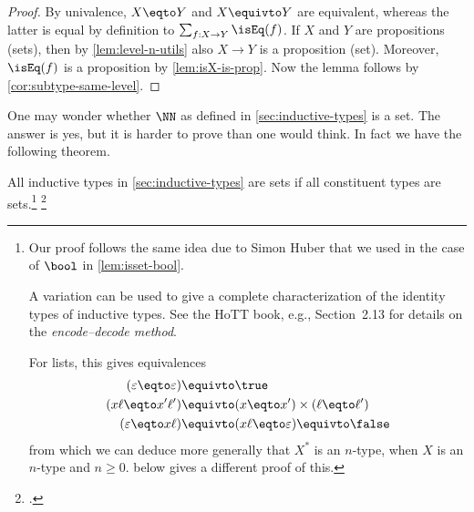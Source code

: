 \begin{proof}
 By univalence, $X \eqto Y$ and $X\equivto Y$ are equivalent,
 whereas the latter is equal by definition to $\sum_{f:X\to Y} \isEq(f)$.
 If $X$ and $Y$ are propositions (sets),
 then by \cref{lem:level-n-utils} also $X\to Y$ is a proposition (set).
 Moreover, $\isEq(f)$ is a proposition by \cref{lem:isX-is-prop}.
 Now the lemma follows by \cref{cor:subtype-same-level}.
\end{proof}

One may wonder whether $\NN$ as defined in \cref{sec:inductive-types}
is a set. The answer is yes, but it is harder to prove than one
would think. In fact we have the following theorem.

\begin{theorem}\label{thm:isset-inductive-types}
  All inductive types in \cref{sec:inductive-types} are sets
  if all constituent types are sets.\footnote{%
    Our proof follows the same
    idea due to Simon Huber that we used in the
    case of $\bool$ in \cref{lem:isset-bool}.

    A variation can be used to give a complete
    characterization of the identity types of
    inductive types.
    See the HoTT book, e.g., Section~2.13 for details
    on the \emph{encode--decode method}.\footnotemark{}

    For lists, this gives equivalences
    \begin{align*}
      (\varepsilon \eqto \varepsilon) &\equivto \true \\
      (x\ell \eqto x'\ell') &\equivto (x \eqto x')\times(\ell \eqto \ell') \\
      (\varepsilon \eqto x\ell) &\equivto (x\ell \eqto \varepsilon) \equivto \false
    \end{align*}
    from which we can deduce more generally that $X^*$ is an $n$-type,
    when $X$ is an $n$-type and $n\ge 0$.
     below gives a different proof of this.}%
  \footcitetext{hottbook}
\end{theorem}

